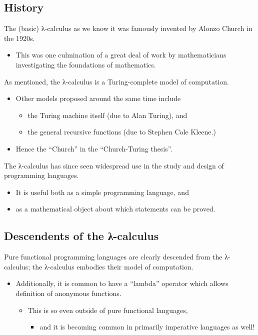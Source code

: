 \documentclass[11pt]{article}
\theoremstyle{definition}
\begin{document}
\subsection{History}
\label{sec:org25a142f}
The (basic) λ-calculus as we know it was famously invented
by Alonzo Church in the 1920s.
\begin{itemize}
\item This was one culmination of a great deal of work by
mathematicians investigating the foundations of mathematics.
\end{itemize}

As mentioned, the λ-calculus is a Turing-complete model of computation.
\begin{itemize}
\item Other models proposed around the same time include
\begin{itemize}
\item the Turing machine itself (due to Alan Turing), and
\item the general recursive functions (due to Stephen Cole Kleene.)
\end{itemize}
\item Hence the “Church” in the “Church-Turing thesis”.
\end{itemize}

The λ-calculus has since seen widespread use in the study and design
of programming languages.
\begin{itemize}
\item It is useful both as a simple programming language, and
\item as a mathematical object about which statements can be proved.
\end{itemize}

\subsection{Descendents of the λ-calculus}
\label{sec:orge9fbe0e}
Pure functional programming languages are clearly descended
from the λ-calculus; the λ-calculus embodies their model of computation.
\begin{itemize}
\item Additionally, it is common to have a “lambda” operator
which allows definition of anonymous functions.
\begin{itemize}
\item This is so even outside of pure functional languages,
\begin{itemize}
\item and it is becoming common
in primarily imperative languages as well!
\end{itemize}
\end{itemize}
\end{itemize}
\end{document}
